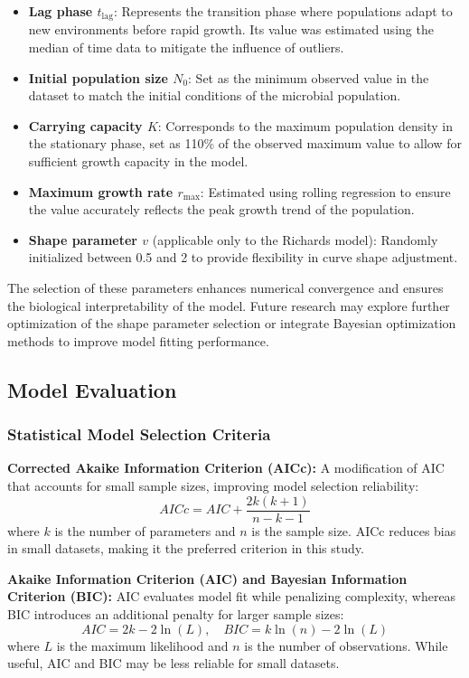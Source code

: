 \documentclass{article}
\begin{document}
\begin{itemize}
    \item \textbf{Lag phase \( t_{\text{lag}} \)}: Represents the transition phase where populations adapt to new environments before rapid growth. Its value was estimated using the median of time data to mitigate the influence of outliers.
    \item \textbf{Initial population size \( N_0 \)}: Set as the minimum observed value in the dataset to match the initial conditions of the microbial population.
    \item \textbf{Carrying capacity \( K \)}: Corresponds to the maximum population density in the stationary phase, set as 110\% of the observed maximum value to allow for sufficient growth capacity in the model.
    \item \textbf{Maximum growth rate \( r_{\text{max}} \)}: Estimated using rolling regression to ensure the value accurately reflects the peak growth trend of the population.
    \item \textbf{Shape parameter \( v \)} (applicable only to the Richards model): Randomly initialized between 0.5 and 2 to provide flexibility in curve shape adjustment.
\end{itemize}

The selection of these parameters enhances numerical convergence and ensures the biological interpretability of the model. Future research may explore further optimization of the shape parameter selection or integrate Bayesian optimization methods to improve model fitting performance.
\subsection{Model Evaluation}

\subsubsection{Statistical Model Selection Criteria}

\textbf{Corrected Akaike Information Criterion (AICc):} A modification of AIC that accounts for small sample sizes, improving model selection reliability:
\begin{equation}
  AICc = AIC + \frac{2k(k+1)}{n-k-1}
\end{equation}
where \( k \) is the number of parameters and \( n \) is the sample size. AICc reduces bias in small datasets, making it the preferred criterion in this study.

\textbf{Akaike Information Criterion (AIC) and Bayesian Information Criterion (BIC):} AIC evaluates model fit while penalizing complexity, whereas BIC introduces an additional penalty for larger sample sizes:
\begin{equation}
  AIC = 2k - 2\ln(L), \quad BIC = k\ln(n) - 2\ln(L)
\end{equation}
where \( L \) is the maximum likelihood and \( n \) is the number of observations. While useful, AIC and BIC may be less reliable for small datasets.
\end{document}
